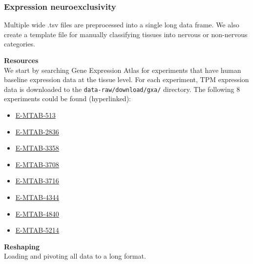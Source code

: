 \hypertarget{expression-neuroexclusivity}{%
\subsubsection{Expression
neuroexclusivity}\label{expression-neuroexclusivity}}

Multiple wide .tsv files are preprocessed into a single long data frame.
We also create a template file for manually classifying tissues into
nervous or non-nervous categories.

\textbf{Resources}\\
We start by searching Gene Expression Atlas for experiments that have
human baseline expression data at the tissue level. For each experiment,
TPM expression data is downloaded to the \texttt{data-raw/download/gxa/}
directory. The following 8 experiments could be found (hyperlinked):

\begin{itemize}
\tightlist
\item
  \href{https://www.ebi.ac.uk/gxa/experiments/E-MTAB-513}{E-MTAB-513}
\item
  \href{https://www.ebi.ac.uk/gxa/experiments/E-MTAB-2836}{E-MTAB-2836}
\item
  \href{https://www.ebi.ac.uk/gxa/experiments/E-MTAB-3358}{E-MTAB-3358}
\item
  \href{https://www.ebi.ac.uk/gxa/experiments/E-MTAB-3708}{E-MTAB-3708}
\item
  \href{https://www.ebi.ac.uk/gxa/experiments/E-MTAB-3716}{E-MTAB-3716}
\item
  \href{https://www.ebi.ac.uk/gxa/experiments/E-MTAB-4344}{E-MTAB-4344}
\item
  \href{https://www.ebi.ac.uk/gxa/experiments/E-MTAB-4840}{E-MTAB-4840}
\item
  \href{https://www.ebi.ac.uk/gxa/experiments/E-MTAB-5214}{E-MTAB-5214}
\end{itemize}

\textbf{Reshaping}\\
Loading and pivoting all data to a long format.

